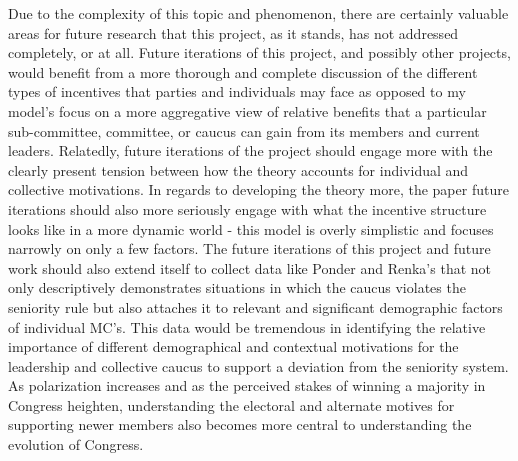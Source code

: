 \documentclass [12pt]{article}
\begin{document}
Due to the complexity of this topic and phenomenon, there are certainly valuable areas for future research that this project, as it stands, has not addressed completely, or at all. Future iterations of this project, and possibly other projects, would benefit from a more thorough and complete discussion of the different types of incentives that parties and individuals may face as opposed to my model's focus on a more aggregative view of relative benefits that a particular sub-committee, committee, or caucus can gain from its members and current leaders. Relatedly, future iterations of the project should engage more with the clearly present tension between how the theory accounts for individual and collective motivations. In regards to developing the theory more, the paper future iterations should also more seriously engage with what the incentive structure looks like in a more dynamic world - this model is overly simplistic and focuses narrowly on only a few factors. The future iterations of this project and future work should also extend itself to collect data like Ponder and Renka's that not only descriptively demonstrates situations in which the caucus violates the seniority rule but also attaches it to relevant and significant demographic factors of individual MC's. This data would be tremendous in identifying the relative importance of different demographical and contextual motivations for the leadership and collective caucus to support a deviation from the seniority system. As polarization increases and as the perceived stakes of winning a majority in Congress heighten, understanding the electoral and alternate motives for supporting newer members also becomes more central to understanding the evolution of Congress.

\newpage


\end{document}
